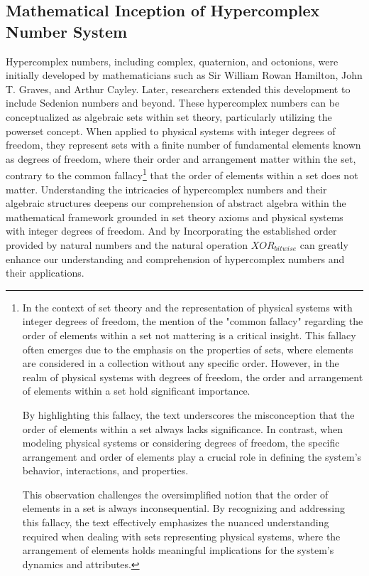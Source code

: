 \documentclass{article}
\begin{document}
\subsection{ Mathematical Inception of Hypercomplex Number System }
Hypercomplex numbers, including complex, quaternion, and octonions, were initially developed by mathematicians such as Sir William Rowan Hamilton, John T. Graves, and Arthur Cayley. Later, researchers extended this development to include Sedenion numbers and beyond. These hypercomplex numbers can be conceptualized as algebraic sets within set theory, particularly utilizing the powerset concept. 
When applied to physical systems with integer degrees of freedom, they represent sets with a finite number of fundamental elements known as degrees of freedom, where their order and arrangement matter within the set, contrary to the common fallacy\footnote{In the context of set theory and the representation of physical systems with integer degrees of freedom, the mention of the "common fallacy" regarding the order of elements within a set not mattering is a critical insight. This fallacy often emerges due to the emphasis on the properties of sets, where elements are considered in a collection without any specific order. However, in the realm of physical systems with degrees of freedom, the order and arrangement of elements within a set hold significant importance.

By highlighting this fallacy, the text underscores the misconception that the order of elements within a set always lacks significance. In contrast, when modeling physical systems or considering degrees of freedom, the specific arrangement and order of elements play a crucial role in defining the system's behavior, interactions, and properties.

This observation challenges the oversimplified notion that the order of elements in a set is always inconsequential. By recognizing and addressing this fallacy, the text effectively emphasizes the nuanced understanding required when dealing with sets representing physical systems, where the arrangement of elements holds meaningful implications for the system's dynamics and attributes.} that the order of elements within a set does not matter. 
Understanding the intricacies of hypercomplex numbers and their algebraic structures deepens our comprehension of abstract algebra within the mathematical framework grounded in set theory axioms and physical systems with integer degrees of freedom. And by Incorporating the established order provided by natural numbers and the natural operation $XOR_{bitwise}$ can greatly enhance our understanding and comprehension of hypercomplex numbers and their applications. 
\end{document}
